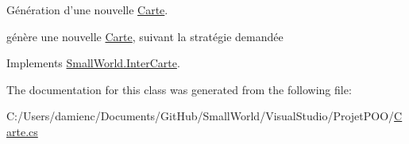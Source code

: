 Génération d'une nouvelle \hyperlink{class_small_world_1_1_carte}{Carte}. 

génère une nouvelle \hyperlink{class_small_world_1_1_carte}{Carte}, suivant la stratégie demandée 

Implements \hyperlink{interface_small_world_1_1_inter_carte}{Small\-World.\-Inter\-Carte}.



The documentation for this class was generated from the following file\-:\begin{DoxyCompactItemize}
\item 
C\-:/\-Users/damienc/\-Documents/\-Git\-Hub/\-Small\-World/\-Visual\-Studio/\-Projet\-P\-O\-O/\hyperlink{_carte_8cs}{Carte.\-cs}\end{DoxyCompactItemize}
